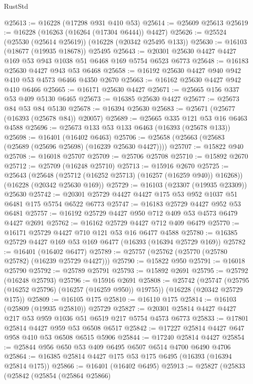 \begin{lexlean}{RustStd}
\begin{coremodule}
@25613 := @16228 (@17298 @931 @410 @53)
@25614 := @25609 @25613
@25619 := @16228 (@16263 (@16264 (@17304 @6444)) @4427)
@25626 := @25524 (@25530 (@25614 @25619)) (@16228 (@20342 @25495 @133))
@25630 := @16103 (@18677 (@19935 @18678)) @25495
@25643 := @20301 @25630 @4427 @4427 @169 @53 @943 @1038 @51 @6468 @169 @5754 @6523 @6773
@25648 := @16183 @25630 @4427 @943 @53 @6468
@25658 := @16192 @25630 @4427 @940 @942 @410 @53 @4573 @6466 @4350 @2670
@25663 := @16162 @25630 @4427 @942 @410 @6466
@25665 := @16171 @25630 @4427
@25671 := @25665 @156 @337 @53 @409 @5130 @6465
@25673 := @16385 @25630 @4427
@25677 := @25673 @84 @53 @84 @5130
@25678 := @16394 @25630
@25683 := @25671 (@25677 (@16393 (@25678 @84)) @20057)
@25689 := @25665 @335 @121 @53 @16 @6463 @4588
@25696 := @25673 @133 @53 @133 @6463 (@16393 (@25678 @133))
@25698 := @16401 (@16402 @6463)
@25706 := @25658 (@25663 (@25683 (@25689 (@25696 @25698) (@16239 @25630 @4427))))
@25707 := @15822 @940
@25708 := @16018 @25707
@25709 := @25706 @25708
@25710 := @15892 @2670
@25712 := @25709 (@16248 @25710)
@25713 := @15916 @2670
@25725 := @25643
    (@25648 (@25712 (@16252 @25713) (@16257 (@16259 @940)) @16268))
    (@16228 (@20342 @25630 @169))
@25729 := @16103 (@23307 (@19935 @23309)) @25630
@25742 := @20301 @25729 @4427 @4427 @175 @53 @952 @1037 @51 @6481 @175 @5754 @6522 @6773
@25747 := @16183 @25729 @4427 @952 @53 @6481
@25757 := @16192 @25729 @4427 @950 @712 @409 @53 @4573 @6479 @4427 @2691
@25762 := @16162 @25729 @4427 @712 @409 @6479
@25770 := @16171 @25729 @4427 @710 @121 @53 @16 @6477 @4588
@25780 := @16385 @25729 @4427 @169 @53 @169 @6477 (@16393 (@16394 @25729 @169))
@25782 := @16401 (@16402 @6477)
@25789 := @25757 (@25762 (@25770 (@25780 @25782) (@16239 @25729 @4427)))
@25790 := @15822 @950
@25791 := @16018 @25790
@25792 := @25789 @25791
@25793 := @15892 @2691
@25795 := @25792 (@16248 @25793)
@25796 := @15916 @2691
@25808 := @25742
    (@25747 (@25795 (@16252 @25796) (@16257 (@16259 @950)) @19755))
    (@16228 (@20342 @25729 @175))
@25809 := @16105 @175
@25810 := @16110 @175
@25814 := @16103 (@25809 (@19935 @25810)) @25729
@25827 := @20301 @25814 @4427 @4427 @217 @53 @959 @1036 @51 @6519 @217 @5754 @4573 @6773
@25833 := @17801 @25814 @4427 @959 @53 @6508 @6517
@25842 := @17227 @25814 @4427 @647 @958 @410 @53 @6508 @6515 @5906
@25844 := @17240 @25814 @4427
@25854 := @25844 @956 @650 @53 @409 @6495 @6507 @6514 @4700 @6490 @4706
@25864 := @16385 @25814 @4427 @175 @53 @175 @6495 (@16393 (@16394 @25814 @175))
@25866 := @16401 (@16402 @6495)
@25913 := @25827
    (@25833
      (@25842
        (@25854
          (@25864 @25866)

\end{coremodule}
\end{lexlean}
